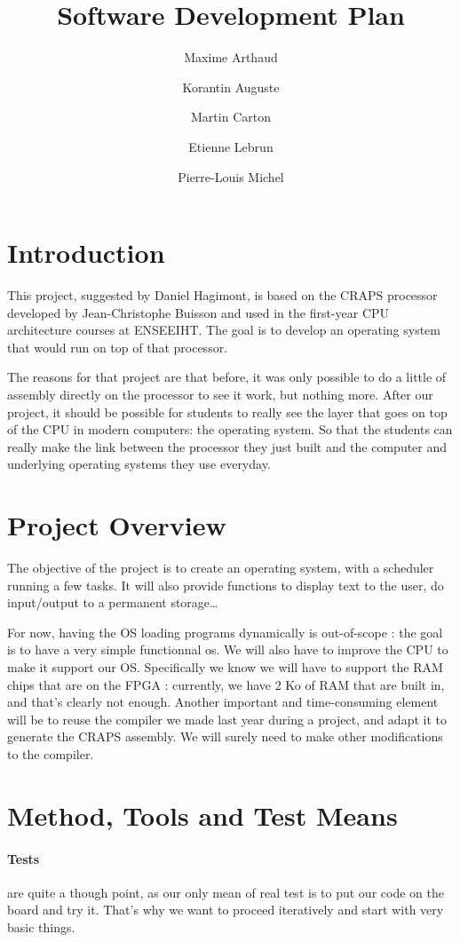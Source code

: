 \documentclass{article}
\title{Software Development Plan}
\author{
       Maxime Arthaud
  \and Korantin Auguste
  \and Martin Carton
  \and Etienne Lebrun
  \and Pierre-Louis Michel
}
\begin{document}
  \maketitle
  \tableofcontents
  \newpage

  \section{Introduction}
    This project, suggested by Daniel Hagimont, is based on the CRAPS processor
    developed by Jean-Christophe Buisson and used in the first-year CPU
    architecture courses at ENSEEIHT. The goal is to develop an operating
    system that would run on top of that processor. 

    The reasons for that project are that before, it was only possible to do a
    little of assembly directly on the processor to see it work, but nothing
    more.  After our project, it should be possible for students to really see
    the layer that goes on top of the CPU in modern computers: the operating
    system. So that the students can really make the link between the processor
    they just built and the computer and underlying operating systems they use
    everyday.


  \section{Project Overview}
    The objective of the project is to create an operating system, with a
    scheduler running a few tasks. It will also provide functions to display
    text to the user, do input/output to a permanent storage\dots

    For now, having the OS loading programs dynamically is out-of-scope : the
    goal is to have a very simple functionnal os.  We will also have to improve
    the CPU to make it support our OS. Specifically we know we will have to
    support the RAM chips that are on the FPGA : currently, we have 2 Ko of RAM
    that are built in, and that's clearly not enough.  Another important and
    time-consuming element will be to reuse the compiler we made last year
    during a project, and adapt it to generate the CRAPS assembly. We will
    surely need to make other modifications to the compiler.

  \section{Method, Tools and Test Means}
    \paragraph{Tests} are quite a though point, as our only mean of real test is
    to put our code on the board and try it. That's why we want to proceed
    iteratively and start with very basic things.
\end{document}
